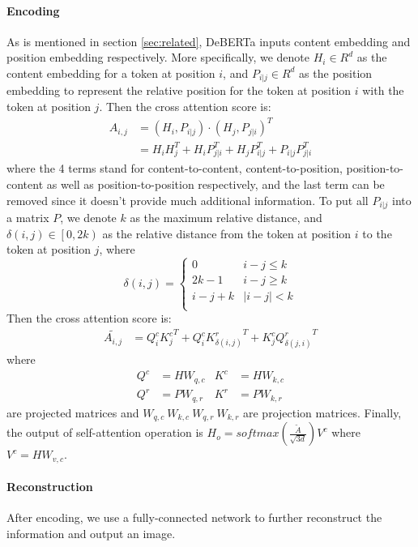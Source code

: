\documentclass{article}
\begin{document}
\paragraph{Encoding}
As is mentioned in section \ref{sec:related}, DeBERTa inputs content embedding and position embedding respectively.
More specifically, we denote $ H_i \in R^d $ as the content embedding for a token at position $ i $, and $ P_{i|j} \in R^d  $ as the position embedding to represent the relative position for the token at position $ i $ with the token at position $ j $. 
Then the cross attention score is:
\begin{align*}
	A_{i,j} 
	&= (H_i, P_{i|j}) \cdot (H_j, P_{j|i})^T \\
	&= H_i H_j^T + H_i P_{j|i}^T 
	+ H_j P_{i|j}^T + P_{i|j} P_{j|i}^T
\end{align*}
where the 4 terms stand for content-to-content, content-to-position, position-to-content as well as position-to-position respectively, and the last term can be removed since it doesn't provide much additional information.
To put all $ P_{i|j} $ into a matrix $ P $, we denote $ k $ as the maximum relative distance, and $ \delta (i,j) \in \left[ 0, 2k \right) $ as the relative distance from the token at position $ i $ to the token at position $ j $, where
\begin{equation*}
	\delta (i,j) = 
	\left\{
	\begin{array}{ll}
		0 & i - j \leq k\\
		2k-1 & i - j \geq k \\
		i-j+k & |i - j| < k \\
	\end{array}
	\right.
\end{equation*}
Then the cross attention score is:
\begin{align*}
	\tilde{A_{i,j}}
	&= Q^c_i {K^c_j}^T 
	+ Q^c_i {K^r_{\delta (i,j)}}^T 
	+ K^c_j {Q^r_{\delta (j,i)}}^T
\end{align*}
where
\begin{align*}
	Q^c &= H W_{q,c} & K^c &= H W_{k,c} \\
	Q^r &= P W_{q,r} & K^r &= P W_{k,r} 
\end{align*}
are projected matrices and $ W_{q,c} \ W_{k,c} \ W_{q,r} \ W_{k,r}$ are projection matrices.
Finally, the output of self-attention operation is
$ H_o = softmax(\frac{\tilde{A}}{\sqrt{3d}}) V^c $
where $ V^c = H W_{v,c} $.

\paragraph{Reconstruction}
After encoding, we use a fully-connected network to further reconstruct the information and output an image.
\end{document}
